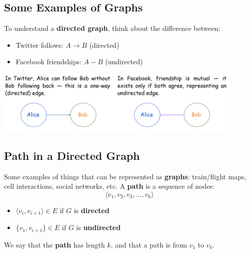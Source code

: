\documentclass[10pt]{article}
\begin{document}
\subsection*{Some Examples of Graphs}
To understand a \textbf{directed graph}, think about the difference between:
\begin{itemize}
	\item Twitter follows: $A \rightarrow B$ (directed)
	\item Facebook friendships: $A - B$ (undirected)
\end{itemize}
\begin{center} 
	\includegraphics*[width=0.9\textwidth]{M4_3.png} 
\end{center}

\subsection*{Path in a Directed Graph}
Some examples of things that can be represented as \textbf{graphs}: train/flight maps, cell interactions, social networks, etc.  A \textbf{path} is a sequence of nodes:
\[\langle v_1, v_2, v_3, \dots, v_k \rangle\]
\begin{center}
\end{center}
\begin{itemize}
	\item $\langle v_i, v_{i + 1} \rangle \in E$ if $G$ is \textbf{directed}
	\item $\{v_1, v_{i + 1}\} \in E$ if $G$ is \textbf{undirected}
\end{itemize}
We say that the \textbf{path} has length $k$, and that a path is from $v_1$ to $v_k$.
\end{document}
